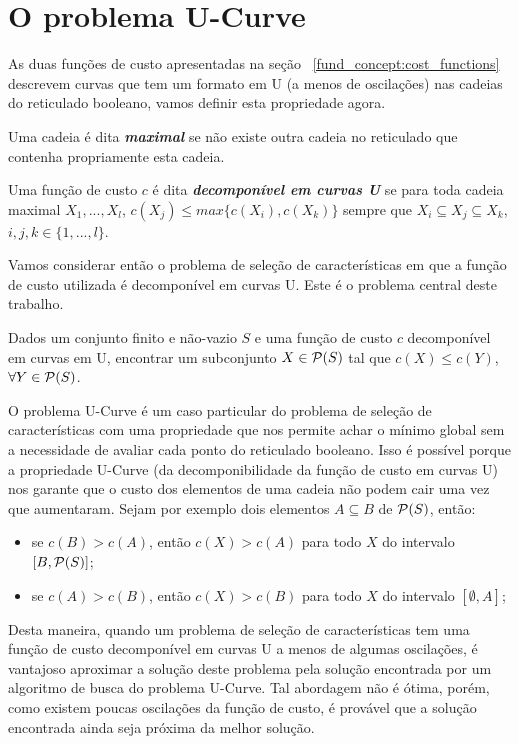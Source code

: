 \section{O problema U-Curve}
As duas funções de custo apresentadas na seção ~\ref{fund_concept:cost_functions}
descrevem curvas que tem um formato em U (a menos de oscilações) nas 
cadeias do reticulado booleano, vamos definir esta propriedade agora.

\begin{mydefinition}
Uma cadeia é dita {\bf \em maximal} se não existe outra cadeia no 
reticulado que contenha propriamente esta cadeia.
\end{mydefinition}

\begin{mydefinition}\label{fund_concepts:ushape}
Uma função de custo $c$ é dita {\bf \em decomponível em curvas U} se
para toda cadeia maximal $X_1, ..., X_l$, $c(X_j) \leq max \{c (X_i),
c (X_k)\}$ sempre que $X_i \subseteq X_j \subseteq X_k$, $i, j, k \in 
\{1, ..., l\}$.
\end{mydefinition}

Vamos considerar então o problema de seleção de características em que a
função de custo utilizada é decomponível em curvas U. Este é o problema 
central deste trabalho.

\begin{mydefinition}
Dados um conjunto finito e não-vazio $S$ e uma função de custo $c$ 
decomponível em curvas em U, encontrar um subconjunto $X \in 
\mathcal{P} (S)$ tal que $c(X) \leq c(Y)$,  $\forall Y \in \mathcal{P} (S)$.
\end{mydefinition}

O problema U-Curve é um caso particular do problema de seleção de 
características com uma propriedade que nos permite achar o mínimo
global sem a necessidade de avaliar cada ponto do reticulado booleano. 
Isso é possível porque a propriedade U-Curve (da decomponibilidade da 
função de custo em curvas U) nos garante que o custo dos elementos de 
uma cadeia não podem cair uma vez que aumentaram. Sejam por exemplo
dois elementos $A \subseteq B$ de $\mathcal{P} (S)$, então:
\begin{itemize}
    \item{se $c(B) > c (A)$, então $c (X) > c (A)$ para todo $X$
        do intervalo $[B, \mathcal{P} (S)]$;}
    \item{se $c(A) > c (B)$, então $c (X) > c (B)$ para todo $X$ 
        do intervalo $[\emptyset, A]$;}
\end{itemize}

Desta maneira, quando um problema de seleção de características tem uma 
função de custo decomponível em curvas U a menos de algumas oscilações,
é vantajoso aproximar a solução deste problema pela solução encontrada
por um algoritmo de busca do problema U-Curve. Tal abordagem não é 
ótima, porém, como existem poucas oscilações da função de custo, é 
provável que a solução encontrada ainda seja próxima da melhor solução.

